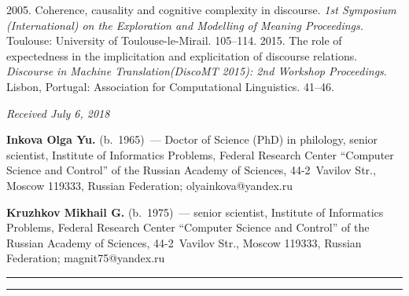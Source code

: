 \begin{multicols}{2}
{{\begin{thebibliography}{99}
   2005. Coherence, causality and cognitive complexity in 
discourse. \textit{1st Symposium (International) on the Exploration and Modelling of 
Meaning Proceedings.} Toulouse: University of Toulouse-le-Mirail. %
105--114.
   2015. The role of 
expectedness in the implicitation and explicitation of discourse relations. 
\textit{Discourse in Machine Translation\linebreak (DiscoMT 2015): 2nd Workshop 
Proceedings}. Lisbon, Portugal: Association for Computational 
Linguistics. 41--46.
\end{thebibliography} } }

\end{multicols}

\vspace*{-6pt}

\hfill{\small\textit{Received July 6, 2018}}

\vspace*{-21pt}
  
  \Contr
  
  \noindent
  \textbf{Inkova Olga Yu.} (b.\ 1965)~--- Doctor of Science (PhD) in philology, 
senior scientist, Institute of Informatics Problems, Federal Research Center 
``Computer Science and Control'' of the Russian Academy of Sciences, 44-2~Vavilov 
Str., Moscow 119333, Russian Federation; \mbox{olyainkova@yandex.ru}
  
  \vspace*{1pt}
  
  \noindent
  \textbf{Kruzhkov Mikhail G.} (b.\ 1975)~--- senior scientist, Institute of 
Informatics Problems, Federal Research Center ``Computer Science and Control'' of 
the Russian Academy of Sciences, 44-2~Vavilov Str., Moscow 119333, Russian 
Federation; \mbox{magnit75@yandex.ru}

\vspace*{8pt}

\hrule

\vspace*{2pt}

\hrule

\vspace*{-2pt}


\def\tit{СТАТИСТИЧЕСКИЙ АНАЛИЗ ЛИНГВОСПЕЦИФИЧНОСТИ КОННЕКТОРОВ
(НА~МАТЕРИАЛЕ~ПАРАЛЛЕЛЬНЫХ КОРПУСОВ)$^*$}

\def\titkol{Статистический анализ лингвоспецифичности коннекторов
(на материале параллельных корпусов)}

